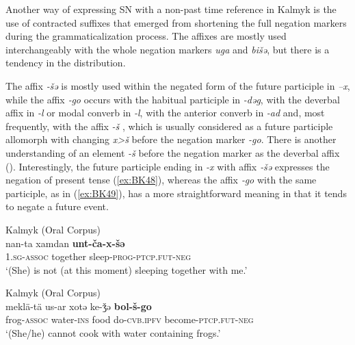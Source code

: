 \documentclass[output=paper,draft,draftmode,colorlinks,citecolor=brown]{langscibook}
\begin{document}
Another way of expressing SN with a non-past time reference in Kalmyk is the use of contracted suffixes that emerged from shortening the full negation markers during the grammaticalization process. The affixes are mostly used interchangeably with the whole negation markers \textit{uga} and \textit{bišǝ}, but there is a tendency in the distribution.

The affix \textit{‑šǝ} is mostly used within the negated form of the future participle in \textit{–x}, while the affix \textit{‑go} occurs with the habitual participle in \textit{-dǝg}, with the deverbal affix in \textit{-l} or modal converb in \textit{-l}, with the anterior converb in \textit{-ad} and, most frequently, with the affix \textit{-š} \citep[13]{baranova2018a}, which is usually considered as a future participle allomorph with changing \textit{x>š} before the negation marker \textit{-go}. There is another understanding of an element \textit{-š} before the negation marker as the deverbal affix (\citep[181-182]{janhunen2012a}). Interestingly, the future participle ending in \textit{-x} with affix \textit{‑šǝ} expresses the negation of present tense (\ref{ex:BK48}), whereas the affix \textit{‑go} with the same participle, as in (\ref{ex:BK49}), has a more straightforward meaning in that it tends to negate a future event.

\newpage
\ea Kalmyk (Oral Corpus) \label{ex:BK48}\\
	\gll nan-ta			xamdan	\textbf{unt-ča-x-šǝ}\\
	1.\textsc{sg-assoc}	together	sleep-\textsc{prog-ptcp.fut-neg}\\
	\glt `(She) is not (at this moment) sleeping together with me.'
\z

\ea Kalmyk (Oral Corpus) \label{ex:BK49}\\
	\gll meklä-tä		us-ar			xotǝ	ke-ǯǝ	\textbf{bol-š-go}\\
	frog-\textsc{assoc}	water-\textsc{ins}	food	do-\textsc{cvb.ipfv}	become-\textsc{ptcp.fut-neg}\\
	\glt `(She/he) cannot cook with water containing frogs.'
\z
\end{document}

